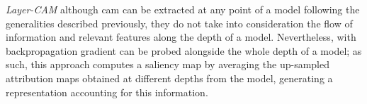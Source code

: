 \noindent \emph{Layer-CAM} \autocite{jiang2021layercam} although \gls{cam} can be extracted at any 
point of a model following the generalities described previously, they do not take into 
consideration the flow of information and relevant features along the depth of a model. 
Nevertheless, with backpropagation gradient can be probed alongside the whole depth of a model; as 
such, this approach computes a saliency map by averaging the up-sampled attribution maps obtained at 
different depths from the model, generating a representation accounting for this information.

